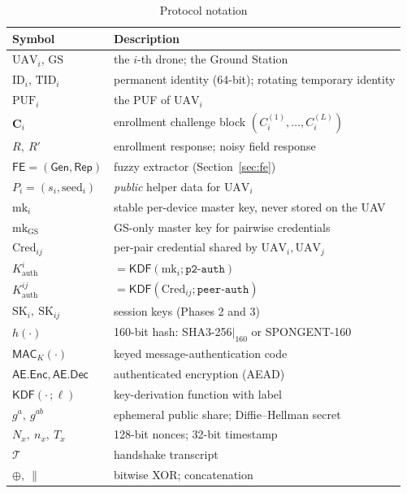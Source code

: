 \documentclass[journal]{IEEEtran}
\begin{document}
\begin{table}[H]
\centering
\caption{Protocol notation}
\label{tab:notation}
\footnotesize
\begin{tabular}{@{}ll@{}}
\toprule
\textbf{Symbol} & \textbf{Description} \\
\midrule
$\text{UAV}_i$, $\text{GS}$ & the $i$-th drone; the Ground Station \\
$\text{ID}_i$, $\text{TID}_i$ & permanent identity (64-bit); rotating temporary identity \\
$\text{PUF}_i$ & the PUF of $\text{UAV}_i$ \\
$\bm{C}_i$ & enrollment challenge block $(C_i^{(1)},\dots,C_i^{(L)})$ \\
$R,\ R'$ & enrollment response; noisy field response \\
$\mathsf{FE}=(\mathsf{Gen},\mathsf{Rep})$ & fuzzy extractor (Section~\ref{sec:fe}) \\
$P_i=(s_i,\text{seed}_i)$ & \emph{public} helper data for $\text{UAV}_i$ \\
$\text{mk}_i$ & stable per-device master key, never stored on the UAV \\
$\text{mk}_{\text{GS}}$ & GS-only master key for pairwise credentials \\
$\text{Cred}_{ij}$ & per-pair credential shared by $\text{UAV}_i,\text{UAV}_j$ \\
$K^{i}_{\text{auth}}$ & $=\mathsf{KDF}(\text{mk}_i;\texttt{p2-auth})$ \\
$K^{ij}_{\text{auth}}$ & $=\mathsf{KDF}(\text{Cred}_{ij};\texttt{peer-auth})$ \\
$\text{SK}_i,\ \text{SK}_{ij}$ & session keys (Phases 2 and 3) \\
$h(\cdot)$ & 160-bit hash: SHA3-256$|_{160}$ or SPONGENT-160 \\
$\mathsf{MAC}_K(\cdot)$ & keyed message-authentication code \\
$\mathsf{AE}.\mathsf{Enc},\mathsf{AE}.\mathsf{Dec}$ & authenticated encryption (AEAD) \\
$\mathsf{KDF}(\cdot\,;\ell)$ & key-derivation function with label \\
$g^{a},\ g^{ab}$ & ephemeral public share; Diffie--Hellman secret \\
$N_x,\ n_x,\ T_x$ & 128-bit nonces; 32-bit timestamp \\
$\mathcal{T}$ & handshake transcript \\
$\oplus,\ \|$ & bitwise XOR; concatenation \\
\bottomrule
\end{tabular}
\end{table}
\end{document}
